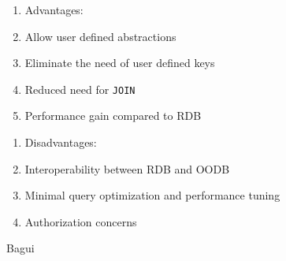 \documentclass{cslthse-msc}
\begin{document}
\begin{center}
\noindent\begin{minipage}[t]{0.5\linewidth}
    \begin{enumerate}
    \item[] Advantages:
    \item{Allow user defined abstractions}
    \item{Eliminate the need of user defined keys}
    \item{Reduced need for \texttt{JOIN}}
    \item{Performance gain compared to RDB}
    \end{enumerate}
    \end{minipage}%
    \begin{minipage}[t]{0.6\linewidth}
    \begin{enumerate}
    \item[] Disadvantages: 
    \item{Interoperability between RDB and OODB }
    \item{Minimal query optimization and performance tuning}
    \item{Authorization concerns}
    \end{enumerate}
\end{minipage}
\end{center}
\begin{flushright}
Bagui \cite{OODBMS}
\end{flushright}
\end{document}
